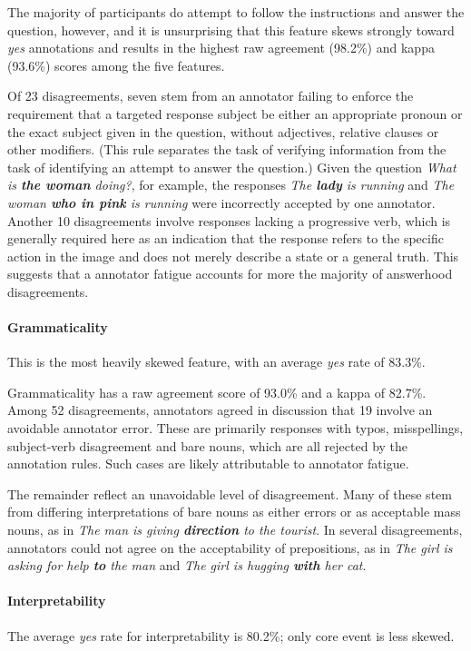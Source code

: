 \documentclass[11pt,a4paper]{article}
\begin{document}
The majority of participants do attempt to follow the instructions and answer the question, however, and it is unsurprising that this feature skews strongly toward \textit{yes} annotations and results in the highest raw agreement (98.2\%) and kappa (93.6\%) scores among the five features.

Of 23 disagreements, seven stem from an annotator failing to enforce the requirement that a targeted response subject be either an appropriate pronoun or the exact subject given in the question, without adjectives, relative clauses or other modifiers. (This rule separates the task of verifying information from the task of identifying an attempt to answer the question.) Given the question \textit{What is \textbf{the woman} doing?}, for example, the responses \textit{The \textbf{lady} is running} and \textit{The woman \textbf{who in pink} is running} were incorrectly accepted by one annotator. Another 10 disagreements involve responses lacking a progressive verb, which is generally required here as an indication that the response refers to the specific action in the image and does not merely describe a state or a general truth. This suggests that a annotator fatigue accounts for more the majority of answerhood disagreements.

\paragraph{Grammaticality} This is the most heavily skewed feature, with an average \textit{yes} rate of 83.3\%.

Grammaticality has a raw agreement score of 93.0\% and a kappa of 82.7\%. Among 52 disagreements, annotators agreed in discussion that 19 involve an avoidable annotator error. These are primarily responses with typos, misspellings, subject-verb disagreement and bare nouns, which are all rejected by the annotation rules. Such cases are likely attributable to annotator fatigue.

The remainder reflect an unavoidable level of disagreement. Many of these stem from differing interpretations of bare nouns as either errors or as acceptable mass nouns, as in \textit{The man is giving \textbf{direction} to the tourist}. In several disagreements, annotators could not agree on the acceptability of prepositions, as in \textit{The girl is asking for help \textbf{to} the man} and \textit{The girl is hugging \textbf{with} her cat}.


\paragraph{Interpretability} The average \textit{yes} rate for interpretability is 80.2\%; only core event is less skewed.
\end{document}
